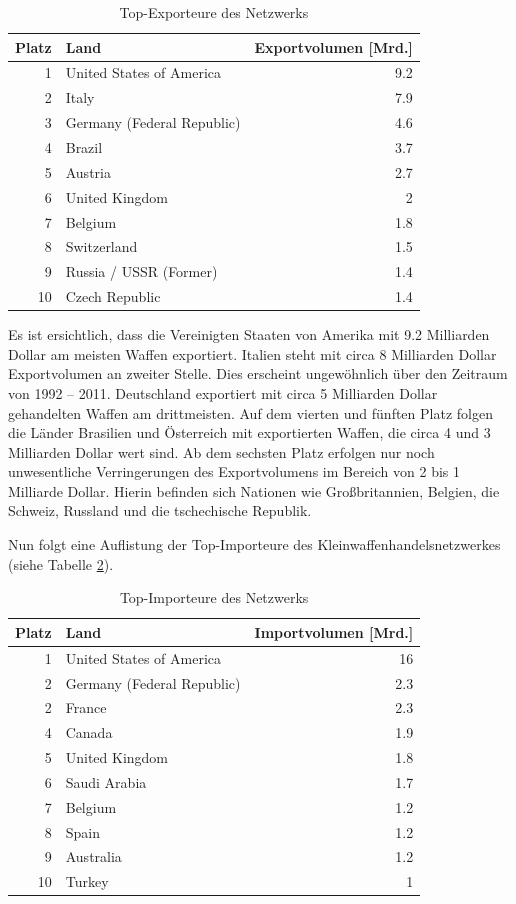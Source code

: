 \documentclass[a4paper,ngerman,oneside,titlepage,bibliography=totoc,11pt]{scrreprt}
\begin{document}
\begin{table}[h]
\centering
\footnotesize
\begin{tabular}{rlr}
  \hline
 Platz & Land & Exportvolumen [Mrd.]\\ 
  \hline
1 & United States of America & 9.2\\ 
  2 & Italy & 7.9 \\ 
  3 & Germany (Federal Republic) & 4.6 \\ 
  4 & Brazil & 3.7 \\ 
  5 & Austria & 2.7 \\ 
  6 & United Kingdom & 2 \\ 
  7 & Belgium & 1.8 \\ 
  8 & Switzerland & 1.5 \\ 
  9 & Russia / USSR (Former) & 1.4 \\ 
  10 & Czech Republic & 1.4 \\ 
   \hline
\end{tabular}
\caption{Top-Exporteure des Netzwerks} 
\label{top_exp}
	\end{table}
	
Es ist ersichtlich, dass die Vereinigten Staaten von Amerika mit 9.2 Milliarden Dollar am meisten Waffen exportiert. Italien steht mit circa 8 Milliarden Dollar Exportvolumen an zweiter Stelle. Dies erscheint ungewöhnlich über den Zeitraum von 1992 -- 2011. Deutschland exportiert mit circa 5 Milliarden Dollar gehandelten Waffen am drittmeisten. Auf dem vierten und fünften Platz folgen die Länder Brasilien und Österreich mit exportierten Waffen, die circa 4 und 3 Milliarden Dollar wert sind. Ab dem sechsten Platz erfolgen nur noch unwesentliche Verringerungen des Exportvolumens im Bereich von 2 bis 1 Milliarde Dollar. Hierin befinden sich Nationen wie Großbritannien, Belgien, die Schweiz, Russland und die tschechische Republik. 

Nun folgt eine Auflistung der Top-Importeure des Kleinwaffenhandelsnetzwerkes (siehe Tabelle \ref{top_imp}).

\begin{table}[h]
\centering
\footnotesize
\begin{tabular}{rlr}
  \hline
 Platz & Land & Importvolumen [Mrd.]\\ 
  \hline
1 & United States of America & 16\\ 
  2 & Germany (Federal Republic) & 2.3\\ 
  2 & France & 2.3\\ 
  4 & Canada & 1.9 \\ 
  5 & United Kingdom & 1.8\\ 
  6 & Saudi Arabia & 1.7\\ 
  7 & Belgium & 1.2\\ 
  8 & Spain & 1.2\\ 
  9 & Australia & 1.2\\ 
  10 & Turkey & 1\\ 
   \hline
\end{tabular}
\caption{Top-Importeure des Netzwerks} 
\label{top_imp}
	\end{table}
		
\end{document}
